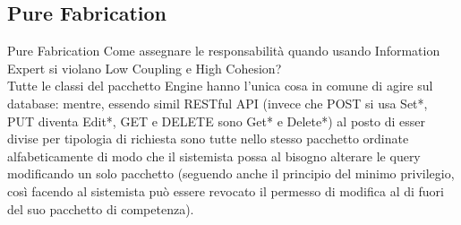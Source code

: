 \documentclass{beamer}
\begin{document}
\subsection{Pure Fabrication}
\begin{frame}{Pure Fabrication}
Come assegnare le responsabilità quando usando Information Expert si violano 
Low Coupling e High Cohesion? \\
\quad Tutte le classi del pacchetto Engine hanno l'unica cosa in comune di 
agire sul database: mentre, essendo simil RESTful API (invece che POST si usa 
Set*, PUT diventa Edit*, GET e DELETE sono Get* e Delete*) al posto di esser 
divise per tipologia di richiesta sono tutte nello stesso pacchetto ordinate 
alfabeticamente di modo che il sistemista possa al bisogno alterare le query 
modificando un solo pacchetto (seguendo anche il principio del minimo 
privilegio, così facendo al sistemista può essere revocato il permesso di 
modifica al di fuori del suo pacchetto di competenza).
\end{frame}


\end{document}
